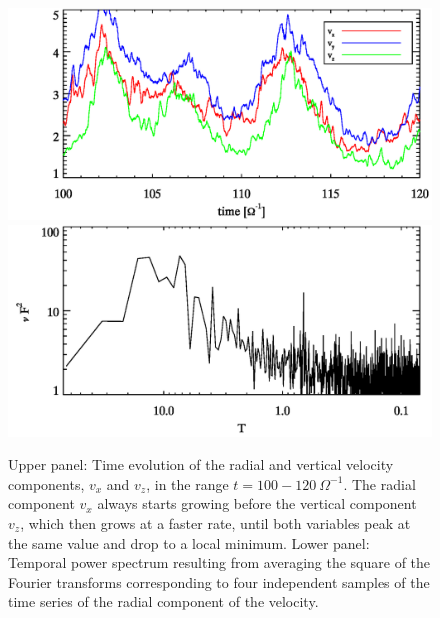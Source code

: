 \documentclass[]{emulateapj}
\begin{document}
\begin{figure}[b]
\begin{center}
\includegraphics[width=0.99 \columnwidth]{f9.png}
\includegraphics[width=0.99 \columnwidth]{f10.png}
\caption{
Upper panel: Time evolution of  the radial and vertical velocity components, 
$v_{x}$ and  $v_{z}$, in the range $t=100-120~\Omega^{-1}$. 
The radial component $v_x$ always starts growing before the vertical component
$v_z$,  which then grows at a faster rate, until both variables peak at the 
same value and drop to a local minimum. 
Lower panel:  Temporal power spectrum resulting from averaging the square 
of the Fourier transforms corresponding to four independent samples of the 
time series of the radial component of the velocity.  
}
\label{fig:incompressiblemrigrowthrates400}
\end{center}
\end{figure}
\end{document}
